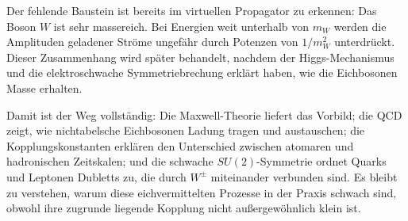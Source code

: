 Der fehlende Baustein ist bereits im virtuellen Propagator zu erkennen: Das Boson \(W\) ist sehr massereich. Bei Energien weit unterhalb von \(m_W\) werden die Amplituden geladener Ströme ungefähr durch Potenzen von \(1/m_W^2\) unterdrückt. Dieser Zusammenhang wird später behandelt, nachdem der Higgs-Mechanismus und die elektroschwache Symmetriebrechung erklärt haben, wie die Eichbosonen Masse erhalten.

\begin{classroomqa}
\end{classroomqa}

Damit ist der Weg vollständig: Die Maxwell-Theorie liefert das Vorbild; die QCD zeigt, wie nichtabelsche Eichbosonen Ladung tragen und austauschen; die Kopplungskonstanten erklären den Unterschied zwischen atomaren und hadronischen Zeitskalen; und die schwache \(SU(2)\)-Symmetrie ordnet Quarks und Leptonen Dubletts zu, die durch \(W^\pm\) miteinander verbunden sind. Es bleibt zu verstehen, warum diese eichvermittelten Prozesse in der Praxis schwach sind, obwohl ihre zugrunde liegende Kopplung nicht außergewöhnlich klein ist.

